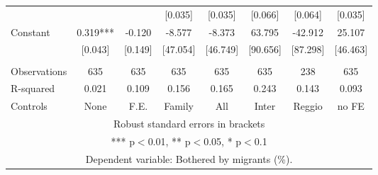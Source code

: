 \begin{tabular}{lccccccc}
 &  &  & [0.035] & [0.035] & [0.066] & [0.064] & [0.035] \\
Constant & 0.319*** & -0.120 & -8.577 & -8.373 & 63.795 & -42.912 & 25.107 \\
 & [0.043] & [0.149] & [47.054] & [46.749] & [90.656] & [87.298] & [46.463] \\
 &  &  &  &  &  &  &  \\
Observations & 635 & 635 & 635 & 635 & 635 & 238 & 635 \\
R-squared & 0.021 & 0.109 & 0.156 & 0.165 & 0.243 & 0.143 & 0.093 \\
 Controls & None & F.E. & Family & All & Inter & Reggio & no FE \\ \hline
\multicolumn{8}{c}{ Robust standard errors in brackets} \\
\multicolumn{8}{c}{ *** p$<$0.01, ** p$<$0.05, * p$<$0.1} \\
\multicolumn{8}{c}{ Dependent variable: Bothered by migrants (\%).} \\
\end{tabular}

